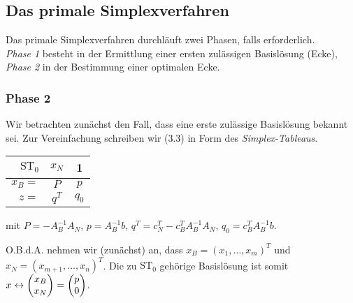 \documentclass[
 a4paper,
 12pt,
 parskip=half
 ]{scrartcl}
\theoremstyle{plain}
\theoremstyle{definition}
\numberwithin{rmrk}{section}
\numberwithin{defn}{section}
\numberwithin{exmp}{section}
\numberwithin{equation}{section}
\begin{document}
\subsection{Das primale Simplexverfahren}
Das primale Simplexverfahren durchläuft zwei Phasen, falls erforderlich. \\
\emph{Phase 1} besteht in der Ermittlung einer ersten zulässigen Basislösung
(Ecke), \\
\emph{Phase 2} in der Bestimmung einer optimalen Ecke.

\subsubsection{Phase 2}
Wir betrachten zunächst den Fall, dass eine erste zulässige  Basislösung bekannt
sei. Zur Vereinfachung schreiben wir (3.3) in Form des \emph{Simplex-Tableaus}.

\begin{tabular}{r|cc}
  $\mathrm{ST}_0$ & $x_N$ & 1 \\
  \hline
  $x_B =$ & $P$ & $p$ \\
  \hline
  $z =$ & $q^T$ & $q_0$
\end{tabular}
mit $P = -A_B^{-1} A_N$, $p = A_B^{-1} b$, $q^T = c_N^T - c_B^T A_B^{-1} A_N$,
$q_0 = c_B^T A_B^{-1} b$.

O.B.d.A. nehmen wir (zunächst) an, dass $x_B = (x_1, \ldots, x_m)^T$ und $x_N
= (x_{m+1}, \ldots, x_n)^T$. Die zu $\mathrm{ST}_0$ gehörige Basislösung ist
somit $x \leftrightarrow \begin{pmatrix}x_B \\ x_N\end{pmatrix} = \begin{pmatrix}p \\ 0\end{pmatrix}$.
\end{document}
